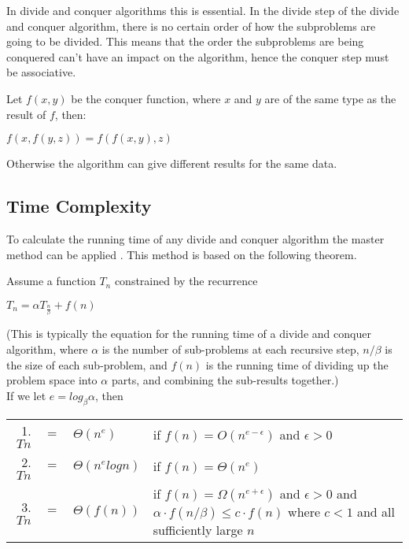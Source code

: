 In divide and conquer algorithms this is essential. In the divide step of the
divide and conquer algorithm, there is no certain order of how the subproblems
are going to be divided. This means that the order the subproblems are being
conquered can't have an impact on the algorithm, hence the conquer step must be
associative.

\begin{example}\label{assprop}
Let $f(x,y)$ be the conquer function, where $x$ and $y$ are of the same type as
the result of $f$, then:
\begin{center}
$f(x,f(y,z)) = f(f(x,y),z)$
\end{center}
Otherwise the algorithm can give different results for the same data.
\end{example}

\subsection{Time Complexity}
To calculate the running time of any divide and conquer algorithm the master
method can be applied \cite{Cormen}. This method is based on the following
theorem.
\begin{theorem} $ $\\
Assume a function $T_n$ constrained by the recurrence
\begin{center}
$T_n = {\alpha}T_{\frac{n}{\beta}}+ f(n)$
\end{center}
(This is typically the equation for the running time of a divide and conquer algorithm, where $\alpha$
is the number of sub-problems at each recursive step, $n/\beta$ is the size of
each sub-problem, and $f(n)$ is the running time of dividing up the problem
space into $\alpha$ parts, and combining the sub-results together.)\\
If we let $e = log_\beta \alpha$, then
\begin{center}
\begin{tabular}{r c l l}
1. $Tn$ & $=$ & $\Theta(n^{e})$ &  if $f(n) = O(n^{e - \epsilon})$ and $\epsilon > 0$\\
2. $Tn$ & $=$ & $\Theta(n^{e} log n)$ & if $f(n) = \Theta(n^e)$\\
3. $Tn$ & $=$ & $\Theta(f(n))$ & \begin{minipage}[t]{0.6 \columnwidth}
  if $f(n) = \Omega(n^{e+\epsilon})$ and $\epsilon > 0$
  and $\alpha \cdot f(n/\beta) \leq c \cdot f(n)$
  where $c < 1$ and all sufficiently large $n$
  \end{minipage}
\end{tabular}
\end{center}
\qeda
\end{theorem}

